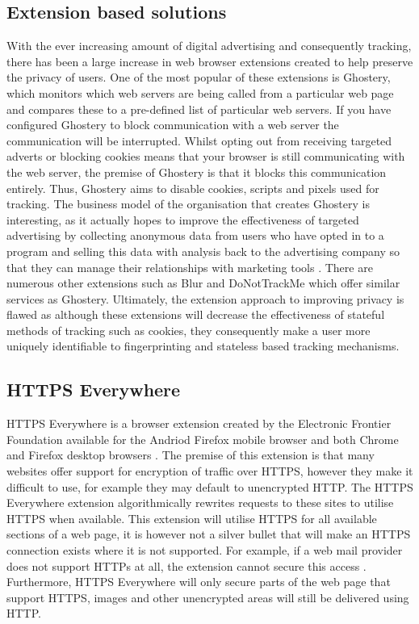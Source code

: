 \documentclass[12pt]{article}
\begin{document}
\subsection{Extension based solutions}
With the ever increasing amount of digital advertising and consequently tracking, there has been a large increase in web browser extensions created to help preserve the privacy of users. One of the most popular of these extensions is Ghostery, which monitors which web servers are being called from a particular web page and compares these to a pre-defined list of particular web servers. If you have configured Ghostery to block communication with a web server the communication will be interrupted. Whilst opting out from receiving targeted adverts or blocking cookies means that your browser is still communicating with the web server, the premise of Ghostery is that it blocks this communication entirely. Thus, Ghostery aims to disable cookies, scripts and pixels used for tracking. The business model of the organisation that creates Ghostery is interesting, as it actually hopes to improve the effectiveness of targeted advertising by collecting anonymous data from users who have opted in to a program and selling this data with analysis back to the advertising company so that they can manage their relationships with marketing tools \parencite{ghostery}. There are numerous other extensions such as Blur and DoNotTrackMe which offer similar services as Ghostery. Ultimately, the extension approach to improving privacy is flawed as although these extensions will decrease the effectiveness of stateful methods of tracking such as cookies, they consequently make a user more uniquely identifiable to fingerprinting and stateless based tracking mechanisms.

\subsection{HTTPS Everywhere}
HTTPS Everywhere is a browser extension created by the Electronic Frontier Foundation available for the Andriod Firefox mobile browser and both Chrome and Firefox desktop browsers \parencite{httpsEverywhere}. The premise of this extension is that many websites offer support for encryption of traffic over HTTPS, however they make it difficult to use, for example they may default to unencrypted HTTP. The HTTPS Everywhere extension algorithmically rewrites requests to these sites to utilise HTTPS when available. This extension will utilise HTTPS for all available sections of a web page, it is however not a silver bullet that will make an HTTPS connection exists where it is not supported. For example, if a web mail provider does not support HTTPs at all, the extension cannot secure this access \parencite{httpsEverywhere}. Furthermore, HTTPS Everywhere will only secure parts of the web page that support HTTPS, images and other unencrypted areas will still be delivered using HTTP.  \\
\end{document}
